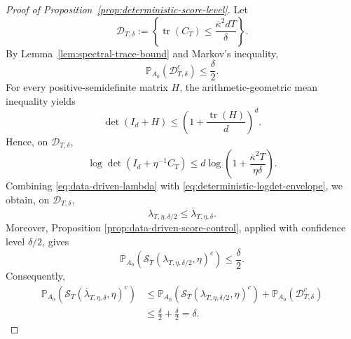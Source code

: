 \documentclass[11pt]{article}
\begin{document}
\begin{proof}[Proof of Proposition~\ref{prop:deterministic-score-level}]
Let
\[
    \mathcal D_{T,\delta}
    :=\left\{
        \operatorname{tr}(C_T)
        \leq\frac{\overline\kappa^2dT}{\delta}
    \right\}.
\]
By Lemma~\ref{lem:spectral-trace-bound} and Markov's inequality,
\[
    \mathbb P_{A_0}\!\left(\mathcal D_{T,\delta}^c\right)
    \leq\frac{\delta}{2}.
\]
For every positive-semidefinite matrix $H$, the arithmetic-geometric mean
inequality yields
\[
    \det(I_d+H)
    \leq\left(1+\frac{\operatorname{tr}(H)}{d}\right)^d.
\]
Hence, on $\mathcal D_{T,\delta}$,
\begin{equation}
    \log\det\!\left(I_d+\eta^{-1}C_T\right)
    \leq
    d\log\!\left(
        1+\frac{\overline\kappa^2T}{\eta\delta}
    \right).
\label{eq:deterministic-logdet-envelope}
\end{equation}
Combining \eqref{eq:data-driven-lambda} with \eqref{eq:deterministic-logdet-envelope},
we obtain, on $\mathcal D_{T,\delta}$,
\[
\lambda_{T,\eta,\delta/2}
\le \overline\lambda_{T,\eta,\delta}.
\]
Moreover, Proposition \ref{prop:data-driven-score-control}, applied with confidence level $\delta/2$,
gives
\[
\mathbb P_{A_0}\!\left(
\mathcal S_T(\lambda_{T,\eta,\delta/2},\eta)^c
\right)\le \frac{\delta}{2}.
\]
Consequently,
\begin{align*}
    \mathbb P_{A_0}\!\left(
        \mathcal S_T(\overline\lambda_{T,\eta,\delta},\eta)^c
    \right)
    &\leq
    \mathbb P_{A_0}\!\left(
        \mathcal S_T(\lambda_{T,\eta,\delta/2},\eta)^c
    \right)
    +\mathbb P_{A_0}\!\left(\mathcal D_{T,\delta}^c\right) \\
    &\leq\frac\delta2+\frac\delta2
    =\delta.
\end{align*}
\end{proof}



\end{document}
